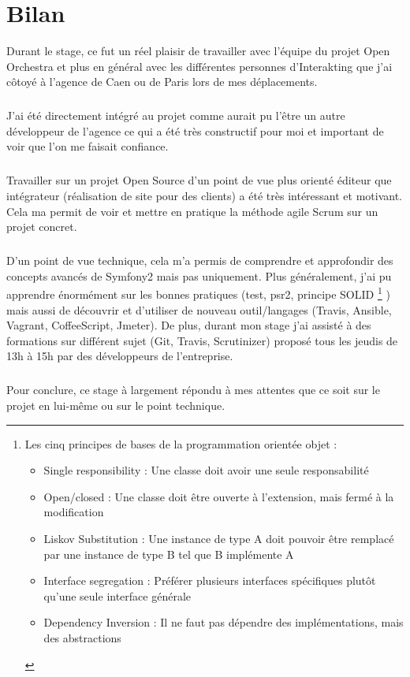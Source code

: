 \chapter*{Bilan}
Durant le stage, ce fut un réel plaisir de travailler avec l'équipe du projet Open Orchestra et plus en général avec les différentes personnes d'Interakting que j'ai côtoyé à l'agence de Caen ou de Paris lors de mes déplacements.
\paragraph{}
J'ai été directement intégré au projet comme aurait pu l'être un autre développeur de l'agence ce qui a été très constructif pour moi et important de voir que l'on me faisait confiance.
\paragraph{}
Travailler sur un projet Open Source d'un point de vue plus orienté éditeur que intégrateur (réalisation de site pour des clients) a été très intéressant et motivant.  Cela ma permit de voir et mettre en pratique la méthode agile Scrum sur un projet concret.
\paragraph{}
D'un point de vue technique, cela m'a permis de comprendre et approfondir des concepts avancés de Symfony2 mais pas uniquement. Plus généralement, j'ai pu apprendre énormément sur les bonnes pratiques (test, psr2, principe SOLID \footnote{Les cinq principes de bases de la programmation orientée objet :
\begin{itemize}
\item Single responsibility : Une classe doit avoir une seule responsabilité
\item Open/closed : Une classe doit être ouverte à l'extension, mais fermé à la modification
\item Liskov Substitution : Une instance de type A doit pouvoir être remplacé par une instance de type B tel que B implémente A
\item Interface segregation : Préférer plusieurs interfaces spécifiques plutôt qu'une seule interface générale
\item Dependency Inversion : Il ne faut pas dépendre des implémentations, mais des abstractions
\end{itemize}
}
) mais aussi de découvrir et d'utiliser de nouveau outil/langages (Travis, Ansible, Vagrant, CoffeeScript, Jmeter). 
De plus, durant mon stage j'ai assisté à des formations sur différent sujet (Git, Travis, Scrutinizer) proposé tous les jeudis de 13h à 15h par des développeurs de l'entreprise.
\paragraph{}
Pour conclure, ce stage à largement répondu à mes attentes que ce soit sur le projet en lui-même ou sur le point technique.